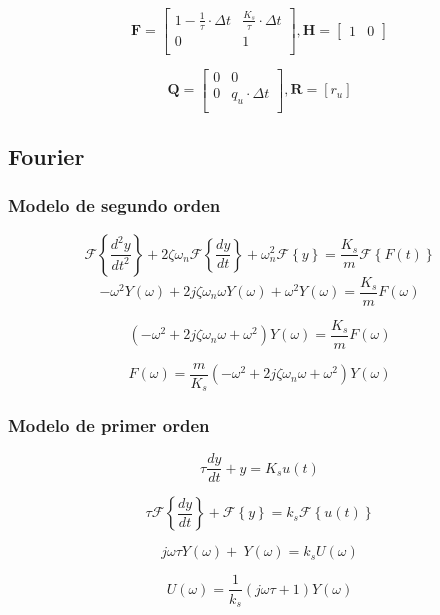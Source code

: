 \documentclass[conference]{IEEEtran}
\begin{document}
\[
	\mathbf{F} = \begin{bmatrix}
		1 -\frac{1}{\tau} \cdot \Delta t          & \frac{K_s}{\tau} \cdot \Delta t               \\
		0 & 1 \\
	\end{bmatrix},
	\mathbf{H} =
	\begin{bmatrix}
		1 & 0
	\end{bmatrix}
\]

\[
\mathbf{Q} = \begin{bmatrix}
	0 & 0  \\
	0 & q_u \cdot \Delta t \\
\end{bmatrix}, 
\mathbf{R} = [r_u]
\]



\subsection{Fourier}

\subsubsection{Modelo de segundo orden}
\[
	\mathcal{F}\left\{ \frac{d^2y}{dt^2} \right\} + 2\zeta\omega_n \mathcal{F}\left\{\frac{dy}{dt}\right\} + \omega_n^2 \mathcal{F}\left\{y\right\} = \frac{K_s}{m} \mathcal{F}\left\{F(t)\right\}
\]
\[
	-\omega^2 Y(\omega)  + 2j\zeta\omega_n\omega Y(\omega) + \omega^2 Y(\omega) = \frac{K_s}{m}F(\omega)
\]
	
\[
	\left(-\omega^2  + 2j\zeta\omega_n\omega + \omega^2 \right) Y(\omega) = \frac{K_s}{m} F(\omega)
\]

\[
	F(\omega) = \frac{m}{K_s}  \left(-\omega^2  + 2j\zeta\omega_n\omega + \omega^2 \right) Y(\omega)
\]



\subsubsection{Modelo de primer orden}

\[
	\tau \frac{dy}{dt} + y = K_s u(t)
\]

\[
	\tau \mathcal{F}\left\{\frac{dy}{dt}\right\} + \mathcal{F} \left\{y\right\} = k_s \mathcal{F} \left\{u(t) \right\}
\]

\[
	 j\omega \tau  Y(\omega) + \ Y(\omega) = k_s U(\omega)
\]

\[
	U(\omega) = \frac{1}{k_s} (j\omega \tau + 1) Y(\omega)
\]
\end{document}
